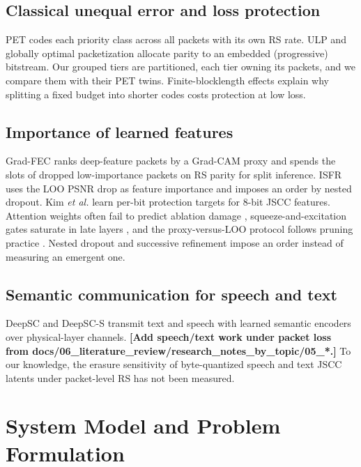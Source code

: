 \documentclass[journal]{IEEEtran}
\providecommand{\TBD}[1]{\textbf{\color{red}[#1]}}
\begin{document}
\subsection{Classical unequal error and loss protection}
PET \cite{albanese1996pet} codes each priority class across all packets with its own RS rate. ULP
\cite{mohr2000ulp} and globally optimal packetization \cite{dumitrescu2004optimal,hamzaoui2005optimized}
allocate parity to an embedded (progressive) bitstream. Our grouped tiers are partitioned, each tier
owning its packets, and we compare them with their PET twins. Finite-blocklength effects
\cite{polyanskiy2010finite} explain why splitting a fixed budget into shorter codes costs protection at
low loss.

\subsection{Importance of learned features}
Grad-FEC \cite{uyanik2023gradfec} ranks deep-feature packets by a Grad-CAM proxy and spends the slots of
dropped low-importance packets on RS parity for split inference. ISFR \cite{zhan2026isfr} uses the LOO
PSNR drop as feature importance and imposes an order by nested dropout. Kim \emph{et al.}
\cite{kim2025uep} learn per-bit protection targets for 8-bit JSCC features. Attention weights often fail
to predict ablation damage \cite{jain2019attention,morcos2018single}, squeeze-and-excitation gates
saturate in late layers \cite{hu2018se}, and the proxy-versus-LOO protocol follows pruning practice
\cite{molchanov2017pruning}. Nested dropout \cite{rippel2014nested} and successive refinement
\cite{kurka2021bandwidth} impose an order instead of measuring an emergent one.

\subsection{Semantic communication for speech and text}
DeepSC \cite{xie2021deepsc} and DeepSC-S \cite{weng2021deepscs} transmit text and speech with learned
semantic encoders over physical-layer channels. \TBD{Add speech/text work under packet loss from
docs/06\_literature\_review/research\_notes\_by\_topic/05\_*.} To our knowledge, the erasure sensitivity
of byte-quantized speech and text JSCC latents under packet-level RS has not been measured.

\section{System Model and Problem Formulation}\label{sec:model}
\end{document}
